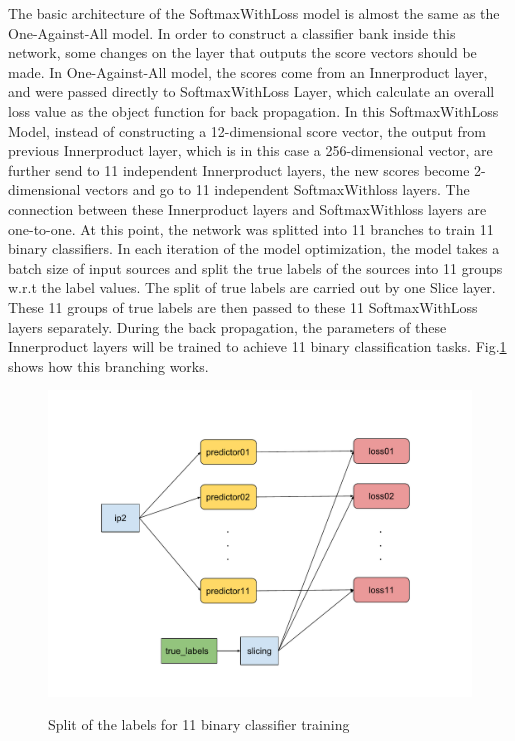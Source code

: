 The basic architecture of the SoftmaxWithLoss model is almost the same as the One-Against-All model. In order to construct a classifier bank inside this network, some changes on the layer that outputs the score vectors should be made. In One-Against-All model, the scores come from an Innerproduct layer, and were passed directly to SoftmaxWithLoss Layer, which calculate an overall loss value as the object function for back propagation. In this SoftmaxWithLoss Model, instead of constructing a 12-dimensional score vector, the output from previous Innerproduct layer, which is in this case a 256-dimensional vector, are further send to 11 independent Innerproduct layers, the new scores become 2-dimensional vectors and go to 11 independent SoftmaxWithloss layers. The connection between these Innerproduct layers and SoftmaxWithloss layers are one-to-one. At this point, the network was splitted into 11 branches to train 11 binary classifiers. In each iteration of the model optimization, the model takes a batch size of input sources and split the true labels of the sources into 11 groups w.r.t the label values. The split of true labels are carried out by one Slice layer. These 11 groups of true labels are then passed to these 11 SoftmaxWithLoss layers separately. During the back propagation, the parameters of these Innerproduct layers will be trained to achieve 11 binary classification tasks. Fig.\ref{fig:slicing} shows how this branching works. 
\begin{figure}[h!]
	\includegraphics[scale=0.5]{../image/chapter2/slicing.pdf}
	\label{fig:slicing}
	\caption{Split of the labels for 11 binary classifier training}
\end{figure}
